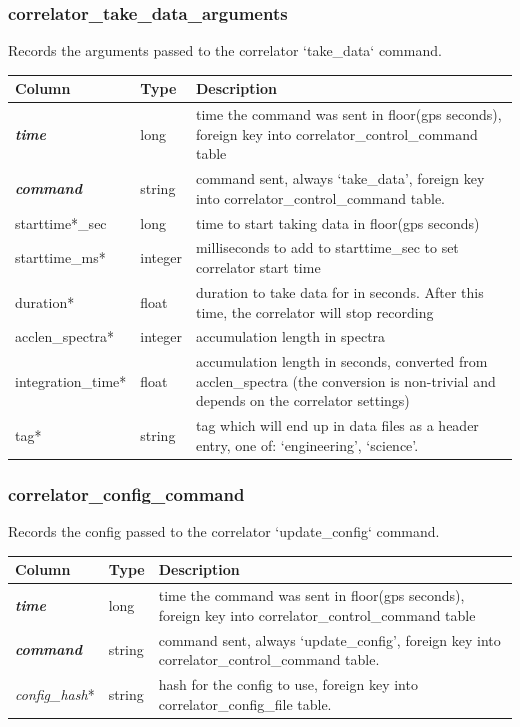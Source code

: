 \documentclass{article}
\begin{document}
{\subsubsection{correlator\_take\_data\_arguments}
Records the arguments passed to the correlator `take\_data` command.
\begin{center}
 \begin{tabular}{| p{4cm} | p{2cm} | p{10cm} |}
\hline
 {\bf Column} & {\bf Type}  & {\bf Description} \\ [0.5ex]  \hline\hline
\textbf{\textit{time}} & long & time the command was sent in floor(gps seconds), foreign key into correlator\_control\_command table\\ \hline
\textbf{\textit{command}} & string & command sent, always `take\_data', foreign key into correlator\_control\_command table.  \\ \hline
starttime*\_sec & long & time to start taking data in floor(gps seconds) \\\hline
starttime\_ms* & integer & milliseconds to add to starttime\_sec to set correlator start time\\\hline
duration* & float & duration to take data for in seconds. After this time, the correlator will stop recording\\\hline
acclen\_spectra* & integer & accumulation length in spectra\\\hline
integration\_time* & float & accumulation length in seconds, converted from acclen\_spectra (the conversion is non-trivial and depends on the correlator settings)\\\hline
tag* & string & tag which will end up in data files as a header entry, one of: `engineering', `science'.\\\hline
\end{tabular}
\end{center}

\subsubsection{correlator\_config\_command}
Records the config passed to the correlator `update\_config` command.
\begin{center}
 \begin{tabular}{| p{4cm} | p{2cm} | p{10cm} |}
\hline
 {\bf Column} & {\bf Type}  & {\bf Description} \\ [0.5ex]  \hline\hline
\textbf{\textit{time}} & long & time the command was sent in floor(gps seconds), foreign key into correlator\_control\_command table\\ \hline
\textbf{\textit{command}} & string & command sent, always `update\_config', foreign key into correlator\_control\_command table.  \\ \hline
\textit{config\_hash}* & string & hash for the config to use, foreign key into correlator\_config\_file table.\\ \hline
\end{tabular}
\end{center}

}
\end{document}
